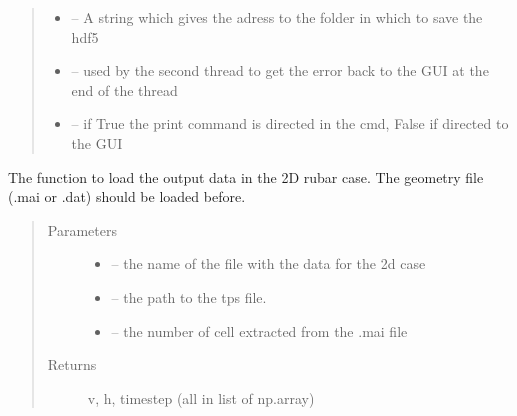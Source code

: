 \documentclass[letterpaper,10pt,english]{sphinxmanual}
\begin{document}
\begin{fulllineitems}
\begin{quote}
\begin{description}
\begin{itemize}
\item {} 
 -- A string which gives the adress to the folder in which to save the hdf5

\item {} 
 -- used by the second thread to get the error back to the GUI at the end of the thread

\item {} 
 -- if True the print command is directed in the cmd, False if directed to the GUI

\end{itemize}

\end{description}\end{quote}

\end{fulllineitems}


\begin{fulllineitems}
\label{\detokenize{index:src.rubar.load_tps_2d}}
The function to load the output data in the 2D rubar case. The geometry file (.mai or .dat) should be loaded before.
\begin{quote}\begin{description}
\item[{Parameters}] \leavevmode\begin{itemize}
\item {} 
 -- the name of the file with the data for the 2d case

\item {} 
 -- the path to the tps file.

\item {} 
 -- the number of cell extracted from the .mai file

\end{itemize}

\item[{Returns}] \leavevmode
v, h, timestep (all in list of np.array)

\end{description}\end{quote}

\end{fulllineitems}
\end{document}
